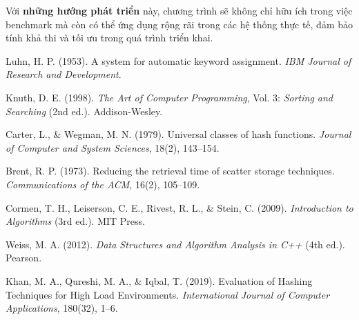 \documentclass[12pt,a4paper]{report}
\begin{document}
Với \textbf{những hướng phát triển} này, chương trình sẽ không chỉ hữu ích trong việc benchmark mà còn có thể ứng dụng rộng rãi trong các hệ thống thực tế, đảm bảo tính khả thi và tối ưu trong quá trình triển khai.

\newpage
{}
{}
\begin{thebibliography}{9}

Luhn, H. P. (1953). A system for automatic keyword assignment. \textit{IBM Journal of Research and Development}.

Knuth, D. E. (1998). \textit{The Art of Computer Programming}, Vol. 3: \textit{Sorting and Searching} (2nd ed.). Addison-Wesley.

Carter, L., \& Wegman, M. N. (1979). Universal classes of hash functions. \textit{Journal of Computer and System Sciences}, 18(2), 143–154.

Brent, R. P. (1973). Reducing the retrieval time of scatter storage techniques. \textit{Communications of the ACM}, 16(2), 105–109.

Cormen, T. H., Leiserson, C. E., Rivest, R. L., \& Stein, C. (2009). \textit{Introduction to Algorithms} (3rd ed.). MIT Press.

Weiss, M. A. (2012). \textit{Data Structures and Algorithm Analysis in C++} (4th ed.). Pearson.

Khan, M. A., Qureshi, M. A., \& Iqbal, T. (2019). Evaluation of Hashing Techniques for High Load Environments. \textit{International Journal of Computer Applications}, 180(32), 1–6.

\end{thebibliography}
\end{document}
